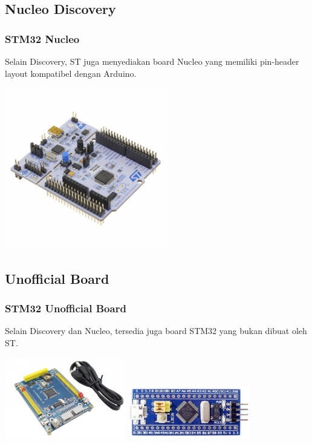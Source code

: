 \documentclass[table,dvipsnames]{beamer}
\begin{document}
	\subsection{Nucleo Discovery}
	\begin{frame}
		\frametitle{STM32 Nucleo}
		\begin{exampleblock}{}
			Selain Discovery, ST juga menyediakan board Nucleo yang memiliki pin-header layout
			kompatibel dengan Arduino.
		\end{exampleblock}

		\begin{center}
			\includegraphics[width=200pt]{images/nucleo}
		\end{center}
	\end{frame}

	\subsection{Unofficial Board}
	\begin{frame}
		\frametitle{STM32 Unofficial Board}
		\begin{exampleblock}{}
			Selain Discovery dan Nucleo, tersedia juga board STM32 yang bukan dibuat oleh ST.
		\end{exampleblock}

		\begin{center}
			\includegraphics[width=150pt]{images/czmini}
			\includegraphics[width=150pt]{images/bluepill}
		\end{center}
	\end{frame}
\end{document}
